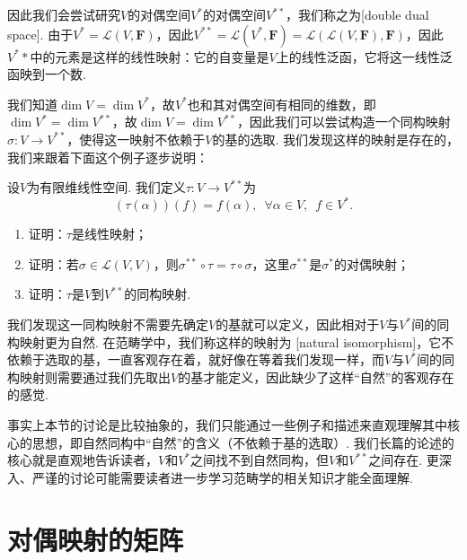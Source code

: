 因此我们会尝试研究$V$的对偶空间$V^*$的对偶空间$V^{**}$，我们称之为[double dual space]. 由于$V^*=\mathcal{L}(V,\mathbf{F})$，因此$V^{**}=\mathcal{L}(V^*,\mathbf{F})=\mathcal{L}(\mathcal{L}(V,\mathbf{F}),\mathbf{F})$，因此$V^**$中的元素是这样的线性映射：它的自变量是$V$上的线性泛函，它将这一线性泛函映到一个数.

我们知道$\dim V=\dim V^*$，故$V^*$也和其对偶空间有相同的维数，即$\dim V^*=\dim V^{**}$，故$\dim V=\dim V^{**}$，因此我们可以尝试构造一个同构映射$\sigma:V\to V^{**}$，使得这一映射不依赖于$V$的基的选取. 我们发现这样的映射是存在的，我们来跟着下面这个例子逐步说明：
\begin{example}
    设$V$为有限维线性空间. 我们定义$\tau:V\to V^{**}$为
    \[(\tau(\alpha))(f)=f(\alpha),\enspace\forall \alpha\in V,\enspace f\in V^*.\]
    \begin{enumerate}
        \item 证明：$\tau$是线性映射；

        \item 证明：若$\sigma\in\mathcal{L}(V,V)$，则$\sigma^{**}\circ\tau=\tau\circ\sigma$，这里$\sigma^{**}$是$\sigma^*$的对偶映射；

        \item 证明：$\tau$是$V$到$V^{**}$的同构映射.
    \end{enumerate}
\end{example}

\begin{solution}

\end{solution}

我们发现这一同构映射不需要先确定$V$的基就可以定义，因此相对于$V$与$V^*$间的同构映射更为自然. 在范畴学中，我们称这样的映射为
[natural isomorphism]，它不依赖于选取的基，一直客观存在着，就好像在等着我们发现一样，而$V$与$V^*$间的同构映射则需要通过我们先取出$V$的基才能定义，因此缺少了这样``自然''的客观存在的感觉.

事实上本节的讨论是比较抽象的，我们只能通过一些例子和描述来直观理解其中核心的思想，即自然同构中``自然''的含义（不依赖于基的选取）. 我们长篇的论述的核心就是直观地告诉读者，$V$和$V^*$之间找不到自然同构，但$V$和$V^{**}$之间存在. 更深入、严谨的讨论可能需要读者进一步学习范畴学的相关知识才能全面理解.

\section{对偶映射的矩阵}

